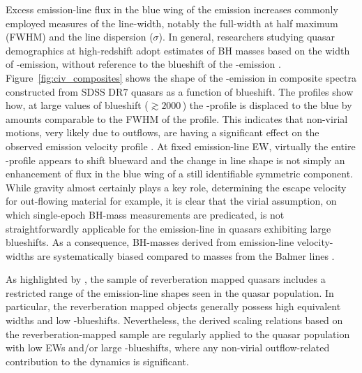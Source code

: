 Excess emission-line flux in the blue wing of the  emission increases commonly employed measures of the line-width, notably the full-width at half maximum (FWHM) and the line dispersion ($\sigma$). 
In general, researchers studying quasar demographics at high-redshift adopt estimates of BH masses based on the width of -emission, without reference to the blueshift of the -emission \citep[e.g.][]{vestergaard04,kollmeier06,gavignaud08,vestergaard08,vestergaard09,kelly10,kelly13}. 
Figure~\ref{fig:civ_composites} shows the shape of the -emission in composite spectra constructed from SDSS DR$7$ quasars as a function of  blueshift. 
The profiles show how, at large values of blueshift ($\gtrsim2000$\,\kms) the -profile is displaced to the blue by amounts comparable to the FWHM of the profile.
This indicates that non-virial motions, very likely due to outflows, are having a significant effect on the observed  emission velocity profile \citep[e.g.][]{gaskell82,baskin05,sulentic07,richards11,wang13}. 
At fixed emission-line EW, virtually the entire -profile appears to shift blueward and the change in line shape is not simply an enhancement of flux in the blue wing of a still identifiable symmetric component. 
While gravity almost certainly plays a key role, determining the escape velocity for out-flowing material for example, it is clear that the virial assumption, on which single-epoch BH-mass measurements are predicated, is not straightforwardly applicable for the  emission-line in quasars exhibiting large blueshifts. 
As a consequence, BH-masses derived from  emission-line velocity-widths are systematically biased compared to masses from the Balmer lines \citep[e.g.][]{shen08,shen12,coatman16}. 

As highlighted by \citet{richards11}, the sample of reverberation mapped quasars includes a restricted range of the  emission-line shapes seen in the quasar population. 
In particular, the reverberation mapped objects generally possess high  equivalent widths and low -blueshifts. 
Nevertheless, the derived scaling relations based on the reverberation-mapped sample are regularly applied to the quasar population with low  EWs and/or large -blueshifts, where any non-virial outflow-related contribution to the dynamics is significant. 

